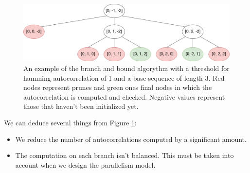   \begin{figure}[ht!]
    \begin{center}
      \includegraphics[scale=0.4]{Chapters/Implementation/Example_branch_bound.png}
    \end{center}
    \caption{An example of the branch and bound algorythm with a threshold for
    hamming autocorrelation of 1 and a base sequence of length 3. Red nodes
    represent prunes and green ones final nodes in which the
    autocorrelation is computed and checked. Negative values represent those
    that haven't been initialized yet.}
    \label{bb:fig:1}
  \end{figure}

  We can deduce several things from Figure \ref{bb:fig:1}:
  \begin{itemize}
    \item We reduce the number of autocorrelations computed by a significant
    amount.
    \item The computation on each branch isn't balanced. This must be taken
    into account when we design the parallelism model.
  \end{itemize}
